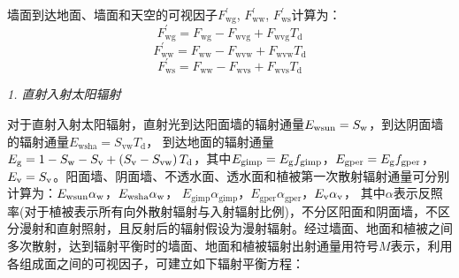 墙面到达地面、墙面和天空的可视因子$F_{\mathrm{wg}}^\prime$, $F_{\mathrm{ww}}^\prime$, $F_{\mathrm{ws}}^\prime$计算为：
\begin{equation}
  F_{\mathrm{wg}}^{\prime}=F_{\mathrm{wg}}-F_{\mathrm{wvg}}+F_{\mathrm{wvg}} T_{\mathrm{d}}
\end{equation}
\begin{equation}
  F_{\mathrm{ww}}^{\prime}=F_{\mathrm{ww}}-F_{\mathrm{wvw}}+F_{\mathrm{wvw}} T_{\mathrm{d}}
\end{equation}
\begin{equation}
  F_{\mathrm{ws}}^{\prime}=F_{\mathrm{ww}}-F_{\mathrm{wvs}}+F_{\mathrm{wvs}} T_{\mathrm{d}}
\end{equation}

\textit{1. 直射入射太阳辐射}

对于直射入射太阳辐射，直射光到达阳面墙的辐射通量$E_{\mathrm{wsun}}=S_{\rm w}$，到达阴面墙的辐射通量$E_{\mathrm{wsha}}=S_{\mathrm{vw}}T_{\mathrm {d}}$，
到达地面的辐射通量$E_{\rm g}=1-S_{\rm w}-S_{\rm v}+\left(S_{\rm v}-S_{\mathrm{vw}}\right)T_{\mathrm {d}}$，其中$E_{\mathrm{gimp}}=E_{\rm g}f_{\mathrm{gimp}}$，$E_{\mathrm{gper}}=E_{\rm g}f_{\mathrm{gper}}$，
$E_{\rm v}=S_{\rm v}$。阳面墙、阴面墙、不透水面、透水面和植被第一次散射辐射通量可分别计算为：$E_{\mathrm{wsun}}\alpha_{\rm w}$，$E_{\mathrm{wsha}}\alpha_{\rm w}$，
$E_{\mathrm{gimp}}\alpha_{\mathrm{gimp}}$，$E_{\mathrm{gper}}\alpha_{\mathrm{gper}}$，$E_{\rm v}\alpha_{\rm v}$，
其中$\alpha$表示反照率(对于植被表示所有向外散射辐射与入射辐射比例)，不分区阳面和阴面墙，不区分漫射和直射照射，且反射后的辐射假设为漫射辐射。经过墙面、地面和植被之间多次散射，达到辐射平衡时的墙面、地面和植被辐射出射通量用符号$M$表示，利用各组成面之间的可视因子，可建立如下辐射平衡方程：
